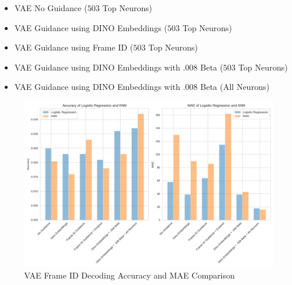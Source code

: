 \documentclass[12pt, letterpaper]{article}
\begin{document}
\begin{itemize}
    \item VAE No Guidance ($503$ Top Neurons)
    \item VAE Guidance using DINO Embeddings ($503$ Top Neurons)
    \item VAE Guidance using Frame ID ($503$ Top Neurons)
    \item VAE Guidance using DINO Embeddings with .008 Beta ($503$ Top Neurons)
    \item VAE Guidance using DINO Embeddings with .008 Beta (All Neurons)
\end{itemize}

\begin{figure}[H]
    \centering
    \includegraphics[width=1.0\textwidth]{vae_models_logistic_knn_comparison.png}
    \caption{VAE Frame ID Decoding Accuracy and MAE Comparison}
    \label{fig:vae_frame_id_decoding_comparison}
\end{figure}
\end{document}
